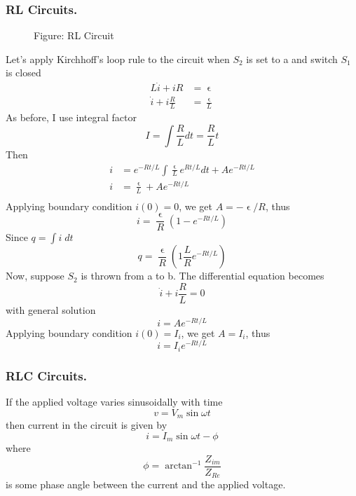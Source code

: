 \documentclass[../../../main.tex]{subfiles}
\begin{document}
\subsubsection{RL Circuits.} 
\begin{figure*}[b]
    \centering
    \caption*{Figure: RL Circuit}
\end{figure*}
Let’s apply Kirchhoff’s loop rule to the circuit when $S_2$ is set to a and switch $S_1$ is closed
\begin{align*}
    L\dot{i}+iR&=\upvarepsilon\\
    \dot{i}+i\frac{R}{L}&=\frac{\upvarepsilon}{L}
\end{align*}
As before, I use integral factor
\begin{equation*}
    I=\int \frac{R}{L}dt=\frac{R}{L}t
\end{equation*}
Then 
\begin{align*}
    i&=e^{-Rt/L}\int \frac{\upvarepsilon}{L}e^{Rt/L}dt+Ae^{-Rt/L}\\
    i&=\frac{\upvarepsilon}{L}+Ae^{-Rt/L}\\
\end{align*}
Applying boundary condition $i(0) = 0$, we get $A=-\upvarepsilon/R$, thus
\begin{equation*}
    i=\frac{\upvarepsilon}{R}(1-e^{-Rt/L})
\end{equation*}
Since $q= \int i\;dt$
\begin{equation*}
    q=\frac{\upvarepsilon}{R}(1\frac{L}{R}e^{-Rt/L})
\end{equation*}
Now, suppose $S_2$ is thrown from a to b. The differential equation becomes
\begin{equation*}
    \dot{i}+i\frac{R}{L}=0
\end{equation*}
with general solution
\begin{equation*}
    i=Ae^{-Rt/L}
\end{equation*}
Applying boundary condition $i(0) = I_i$, we get $A = I_i$, thus
\begin{equation*}
    i=I_ie^{-Rt/L}
\end{equation*}

\subsubsection{RLC Circuits.} If the applied voltage varies sinusoidally with time
\begin{equation*}
    v=V_m\sin \omega t
\end{equation*}
then current in the circuit is given by
\begin{equation*}
    i=I_m\sin\omega t-\phi
\end{equation*}
where
\begin{equation*}
    \phi=\arctan^{-1}\frac{Z_{im}}{Z_{Re}}
\end{equation*}
is some phase angle between the current and the applied voltage.
\end{document}
